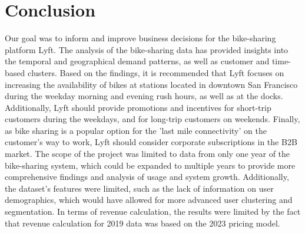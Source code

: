 \chapter{Conclusion}

Our goal was to inform and improve business decisions for the bike-sharing platform Lyft. The analysis of the bike-sharing data has provided insights into the temporal and geographical demand patterns, as well as customer and time-based clusters. Based on the findings, it is recommended that Lyft focuses on increasing the availability of bikes at stations located in downtown San Francisco during the weekday morning and evening rush hours, as well as at the docks. Additionally, Lyft should provide promotions and incentives for short-trip customers during the weekdays, and for long-trip customers on weekends. Finally, as bike sharing is a popular option for the 'last mile connectivity' on the customer's way to work, Lyft should consider corporate subscriptions in the B2B market.
The scope of the project was limited to data from only one year of the bike-sharing system, which could be expanded to multiple years to provide more comprehensive findings and analysis of usage and system growth. Additionally, the dataset's features were limited, such as the lack of information on user demographics, which would have allowed for more advanced user clustering and segmentation. In terms of revenue calculation, the results were limited by the fact that revenue calculation for 2019 data was based on the 2023 pricing model. 
